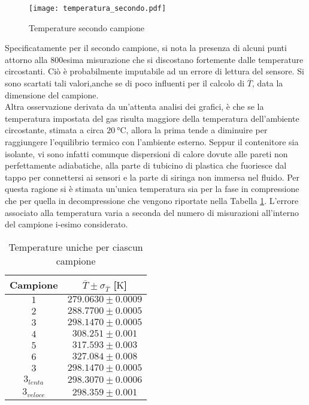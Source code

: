\documentclass[a4paper,11pt,oneside]{article}
\begin{document}
\begin{figure}[h!]
    \centering
    \texttt{[image: temperatura\_secondo.pdf]}
    \caption{Temperature secondo campione}
    \label{fig:campione_temperatura}
\end{figure}

Specificatamente per il secondo campione, si nota la presenza di alcuni punti attorno alla 800esima misurazione che si discostano fortemente dalle temperature circostanti. Ciò è probabilmente imputabile ad un errore di lettura del sensore. Si sono scartati tali valori,anche se di poco influenti per il calcolo di $\overline{T}$, data la dimensione del campione.\\
Altra osservazione derivata da un'attenta analisi dei grafici, è che se la temperatura impostata del gas risulta maggiore della temperatura dell'ambiente circostante, stimata a circa $\SI{20}{\celsius}$, allora la prima tende a diminuire per raggiungere l'equilibrio termico con l'ambiente esterno. Seppur il contenitore sia isolante, vi sono infatti comunque dispersioni di calore dovute alle pareti non perfettamente adiabatiche, alla parte di tubicino di plastica che fuoriesce dal tappo per connettersi ai sensori e la parte di siringa non immersa nel fluido. Per questa ragione si è stimata un'unica temperatura sia per la fase in compressione che per quella in decompressione che vengono riportate nella Tabella \ref{tab:temp_unica}. L'errore associato alla temperatura varia a seconda del numero di misurazioni all'interno del campione i-esimo considerato. %

\begin{table}[h!]
    \centering
    \begin{tabular}{|c|c|}
        \hline
        Campione & $\overline{T}\pm\sigma_{\overline{T}}$ [$\si{\kelvin}$] \\ \hline
        \rowcolor[rgb]{0.85,0.85,0.85}$1$ & $279.0630\pm0.0009$ \\ \hline
        $2$ & $288.7700\pm0.0005$ \\ \hline
        \rowcolor[rgb]{0.85,0.85,0.85}$3$ & $298.1470\pm0.0005$ \\ \hline
        $4$ & $308.251\pm0.001$ \\ \hline
        \rowcolor[rgb]{0.85,0.85,0.85}$5$ & $317.593\pm0.003$ \\ \hline
        $6$ & $327.084\pm0.008$ \\ \hline \hline
        \rowcolor[rgb]{0.85,0.85,0.85}$3$ & $298.1470\pm0.0005$ \\ \hline
        $3_{lenta}$ & $298.3070\pm0.0006$ \\ \hline
        \rowcolor[rgb]{0.85,0.85,0.85}$3_{veloce}$ & $298.359\pm0.001$ \\ \hline
    \end{tabular}
    \caption{Temperature uniche per ciascun campione}
    \label{tab:temp_unica}
\end{table}
\end{document}
